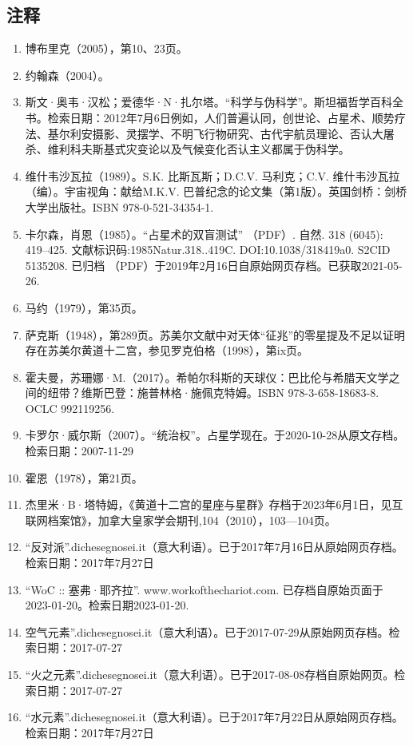 \subsection{注释}
\begin{enumerate}
\item 博布里克（2005），第10、23页。
\item 约翰森（2004）。
\item 斯文·奥韦·汉松；爱德华·N·扎尔塔。“科学与伪科学”。斯坦福哲学百科全书。检索日期：2012年7月6日例如，人们普遍认同，创世论、占星术、顺势疗法、基尔利安摄影、灵摆学、不明飞行物研究、古代宇航员理论、否认大屠杀、维利科夫斯基式灾变论以及气候变化否认主义都属于伪科学。
\item 维什韦沙瓦拉（1989）。S.K. 比斯瓦斯；D.C.V. 马利克；C.V. 维什韦沙瓦拉（编）。宇宙视角：献给M.K.V. 巴普纪念的论文集（第1版）。英国剑桥：剑桥大学出版社。ISBN 978-0-521-34354-1.
\item 卡尔森，肖恩（1985）。“占星术的双盲测试” （PDF）. 自然. 318 (6045): 419–425. 文献标识码:1985Natur.318..419C. DOI:10.1038/318419a0. S2CID 5135208. 已归档 （PDF）于2019年2月16日自原始网页存档。已获取2021-05-26.
\item 马约（1979），第35页。
\item 萨克斯（1948），第289页。苏美尔文献中对天体“征兆”的零星提及不足以证明存在苏美尔黄道十二宫，参见罗克伯格（1998），第ix页。
\item 霍夫曼，苏珊娜·M.（2017）。希帕尔科斯的天球仪：巴比伦与希腊天文学之间的纽带？维斯巴登：施普林格·施佩克特姆。ISBN 978-3-658-18683-8. OCLC 992119256.
\item 卡罗尔·威尔斯（2007）。“统治权”。占星学现在。于2020-10-28从原文存档。检索日期：2007-11-29
\item 霍恩（1978），第21页。
\item 杰里米·B·塔特姆，《黄道十二宫的星座与星群》存档于2023年6月1日，见互联网档案馆》，加拿大皇家学会期刊,104（2010），103—104页。
\item “反对派”.dichesegnosei.it（意大利语）。已于2017年7月16日从原始网页存档。检索日期：2017年7月27日
\item “WoC :: 塞弗·耶齐拉”. www.workofthechariot.com. 已存档自原始页面于2023-01-20。检索日期2023-01-20.
\item 空气元素”.dichesegnosei.it（意大利语）。已于2017-07-29从原始网页存档。检索日期：2017-07-27
\item “火之元素”.dichesegnosei.it（意大利语）。已于2017-08-08存档自原始网页。检索日期：2017-07-27
\item “水元素”.dichesegnosei.it（意大利语）。已于2017年7月22日从原始网页存档。检索日期：2017年7月27日

\end{enumerate}

